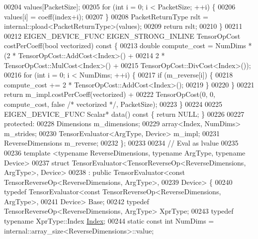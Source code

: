 \begin{DoxyCode}
00204                                                             values[PacketSize];
00205     \textcolor{keywordflow}{for} (\textcolor{keywordtype}{int} i = 0; i < PacketSize; ++i) \{
00206       values[i] = coeff(index+i);
00207     \}
00208     PacketReturnType rslt = internal::pload<PacketReturnType>(values);
00209     \textcolor{keywordflow}{return} rslt;
00210   \}
00211 
00212   EIGEN\_DEVICE\_FUNC EIGEN\_STRONG\_INLINE TensorOpCost costPerCoeff(\textcolor{keywordtype}{bool} vectorized)\textcolor{keyword}{ const }\{
00213     \textcolor{keywordtype}{double} compute\_cost = NumDims * (2 * TensorOpCost::AddCost<Index>() +
00214                                      2 * TensorOpCost::MulCost<Index>() +
00215                                      TensorOpCost::DivCost<Index>());
00216     \textcolor{keywordflow}{for} (\textcolor{keywordtype}{int} i = 0; i < NumDims; ++i) \{
00217       \textcolor{keywordflow}{if} (m\_reverse[i]) \{
00218         compute\_cost += 2 * TensorOpCost::AddCost<Index>();
00219       \}
00220     \}
00221     \textcolor{keywordflow}{return} m\_impl.costPerCoeff(vectorized) +
00222            TensorOpCost(0, 0, compute\_cost, \textcolor{keyword}{false} \textcolor{comment}{/* vectorized */}, PacketSize);
00223   \}
00224 
00225   EIGEN\_DEVICE\_FUNC Scalar* data()\textcolor{keyword}{ const }\{ \textcolor{keywordflow}{return} NULL; \}
00226 
00227  \textcolor{keyword}{protected}:
00228   Dimensions m\_dimensions;
00229   array<Index, NumDims> m\_strides;
00230   TensorEvaluator<ArgType, Device> m\_impl;
00231   ReverseDimensions m\_reverse;
00232 \};
00233 
00234 \textcolor{comment}{// Eval as lvalue}
00235 
00236 \textcolor{keyword}{template} <\textcolor{keyword}{typename} ReverseDimensions, \textcolor{keyword}{typename} ArgType, \textcolor{keyword}{typename} Device>
00237 \textcolor{keyword}{struct }TensorEvaluator<TensorReverseOp<ReverseDimensions, ArgType>, Device>
00238     : \textcolor{keyword}{public} TensorEvaluator<const TensorReverseOp<ReverseDimensions, ArgType>,
00239                              Device> \{
00240   \textcolor{keyword}{typedef} TensorEvaluator<const TensorReverseOp<ReverseDimensions, ArgType>,
00241                           Device> Base;
00242   \textcolor{keyword}{typedef} TensorReverseOp<ReverseDimensions, ArgType> XprType;
00243   \textcolor{keyword}{typedef} \textcolor{keyword}{typename} XprType::Index \hyperlink{namespace_eigen_a62e77e0933482dafde8fe197d9a2cfde}{Index};
00244   \textcolor{keyword}{static} \textcolor{keyword}{const} \textcolor{keywordtype}{int} NumDims = internal::array\_size<ReverseDimensions>::value;

\end{DoxyCode}

